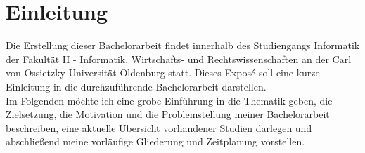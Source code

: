 \chapter{Einleitung}
Die Erstellung dieser Bachelorarbeit findet innerhalb des Studiengangs Informatik der Fakult\"at II - Informatik, Wirtschafts- und Rechtswissenschaften an der Carl von Ossietzky Universit\"at Oldenburg statt.
Dieses Expos\'{e} soll eine kurze Einleitung in die durchzuf\"uhrende Bachelorarbeit darstellen.\\

Im Folgenden m\"ochte ich eine grobe Einf\"uhrung in die Thematik geben, die Zielsetzung, die Motivation und die Problemstellung meiner Bachelorarbeit beschreiben, eine aktuelle \"Ubersicht vorhandener Studien darlegen und abschlie{\ss}end meine vorl\"aufige Gliederung und Zeitplanung vorstellen.